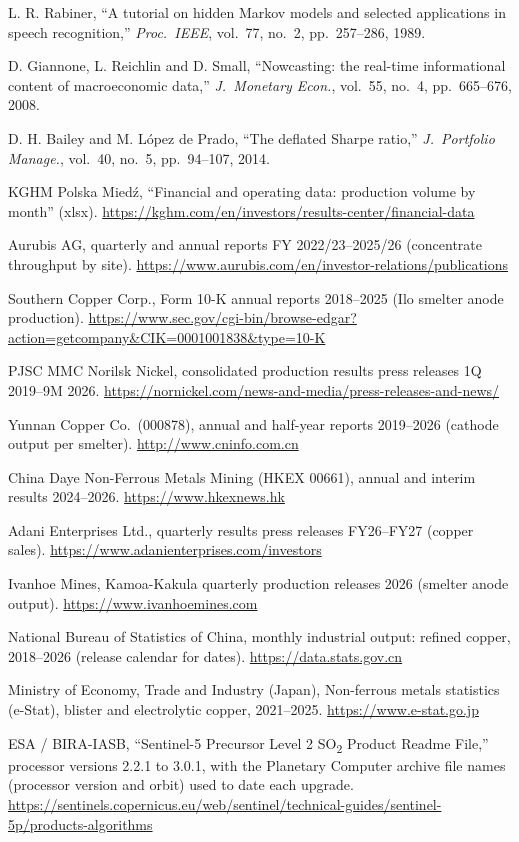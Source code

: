\documentclass[10pt,a4paper]{article}
\newcommand{\SOtwo}{SO\textsubscript{2}}
\begin{document}
\begin{enumerate}[label={[\arabic*]},leftmargin=2.2em,itemsep=1pt]
\item L. R. Rabiner, ``A tutorial on hidden Markov models and selected applications in speech recognition,'' \emph{Proc.\ IEEE}, vol.\ 77, no.\ 2, pp.\ 257--286, 1989.
\item D. Giannone, L. Reichlin and D. Small, ``Nowcasting: the real-time informational content of macroeconomic data,'' \emph{J.\ Monetary Econ.}, vol.\ 55, no.\ 4, pp.\ 665--676, 2008.
\item D. H. Bailey and M. López de Prado, ``The deflated Sharpe ratio,'' \emph{J.\ Portfolio Manage.}, vol.\ 40, no.\ 5, pp.\ 94--107, 2014.
\item KGHM Polska Mied\'z, ``Financial and operating data: production volume by month'' (xlsx). \url{https://kghm.com/en/investors/results-center/financial-data}
\item Aurubis AG, quarterly and annual reports FY 2022/23--2025/26 (concentrate throughput by site). \url{https://www.aurubis.com/en/investor-relations/publications}
\item Southern Copper Corp., Form 10-K annual reports 2018--2025 (Ilo smelter anode production). \url{https://www.sec.gov/cgi-bin/browse-edgar?action=getcompany&CIK=0001001838&type=10-K}
\item PJSC MMC Norilsk Nickel, consolidated production results press releases 1Q 2019--9M 2026. \url{https://nornickel.com/news-and-media/press-releases-and-news/}
\item Yunnan Copper Co.\ (000878), annual and half-year reports 2019--2026 (cathode output per smelter). \url{http://www.cninfo.com.cn}
\item China Daye Non-Ferrous Metals Mining (HKEX 00661), annual and interim results 2024--2026. \url{https://www.hkexnews.hk}
\item Adani Enterprises Ltd., quarterly results press releases FY26--FY27 (copper sales). \url{https://www.adanienterprises.com/investors}
\item Ivanhoe Mines, Kamoa-Kakula quarterly production releases 2026 (smelter anode output). \url{https://www.ivanhoemines.com}
\item National Bureau of Statistics of China, monthly industrial output: refined copper, 2018--2026 (release calendar for dates). \url{https://data.stats.gov.cn}
\item Ministry of Economy, Trade and Industry (Japan), Non-ferrous metals statistics (e-Stat), blister and electrolytic copper, 2021--2025. \url{https://www.e-stat.go.jp}
\item ESA / BIRA-IASB, ``Sentinel-5 Precursor Level 2 \SOtwo{} Product Readme File,'' processor versions 2.2.1 to 3.0.1, with the Planetary Computer archive file names (processor version and orbit) used to date each upgrade. \url{https://sentinels.copernicus.eu/web/sentinel/technical-guides/sentinel-5p/products-algorithms}

\end{enumerate}
\end{document}
